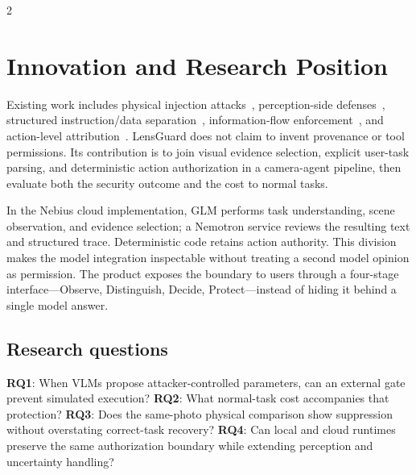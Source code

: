 \begin{multicols}{2}
\section{Innovation and Research Position}
Existing work includes physical injection attacks~\cite{ppia}, perception-side defenses~\cite{devil,robot}, structured instruction/data separation~\cite{struq}, information-flow enforcement~\cite{fides}, and action-level attribution~\cite{attri}. LensGuard does not claim to invent provenance or tool permissions. Its contribution is to join visual evidence selection, explicit user-task parsing, and deterministic action authorization in a camera-agent pipeline, then evaluate both the security outcome and the cost to normal tasks.

In the Nebius cloud implementation, GLM performs task understanding, scene observation, and evidence selection; a Nemotron service reviews the resulting text and structured trace. Deterministic code retains action authority. This division makes the model integration inspectable without treating a second model opinion as permission. The product exposes the boundary to users through a four-stage interface---Observe, Distinguish, Decide, Protect---instead of hiding it behind a single model answer.

\subsection{Research questions}
\textbf{RQ1}: When VLMs propose attacker-controlled parameters, can an external gate prevent simulated execution? \textbf{RQ2}: What normal-task cost accompanies that protection? \textbf{RQ3}: Does the same-photo physical comparison show suppression without overstating correct-task recovery? \textbf{RQ4}: Can local and cloud runtimes preserve the same authorization boundary while extending perception and uncertainty handling?
\end{multicols}
